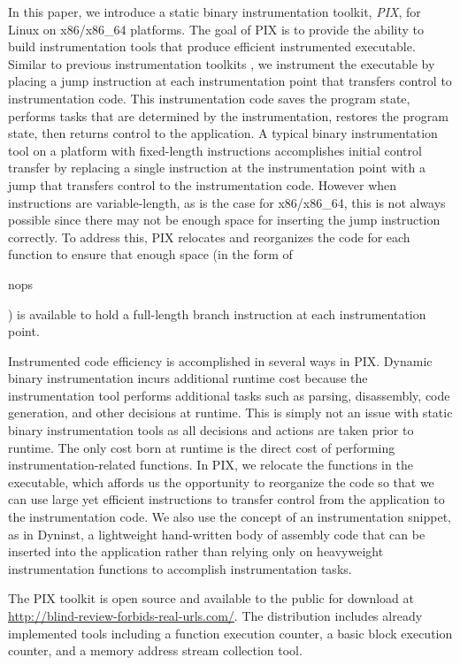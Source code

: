 In this paper, we introduce a static binary instrumentation toolkit, \textit{PIX}, for Linux on
x86/x86\_64 platforms. The goal of PIX is to provide the ability
to build instrumentation tools that produce efficient instrumented
executable. Similar to previous instrumentation toolkits \cite{buck2000api}, we instrument the executable 
by placing a jump instruction at each instrumentation
point that transfers control to instrumentation code. This instrumentation code saves the
program state, performs tasks that are determined by the instrumentation,
restores the program state, then returns control to the application.
A typical binary instrumentation tool on a platform with fixed-length instructions 
\cite{tikir2006pmac} accomplishes initial control transfer by replacing a
single instruction at the instrumentation point with a jump that transfers
control to the instrumentation code. However when instructions are variable-length, as
is the case for x86/x86\_64, this is not always possible since there may not be enough space for 
inserting the jump instruction correctly. To address this, PIX
relocates and reorganizes the code for each function to ensure that enough
space (in the form of \begin{it}nops\end{it}) is available to hold a full-length branch instruction at each
instrumentation point.

Instrumented code efficiency is accomplished in several ways in PIX. Dynamic binary instrumentation
incurs additional runtime cost because the instrumentation tool performs additional tasks such 
as parsing, disassembly, code generation, and other decisions at runtime. This
 is simply not an issue with static binary instrumentation tools as all
decisions and actions are taken prior to runtime. The only cost born at runtime is the direct
cost of performing instrumentation-related functions. In PIX, we relocate the 
functions in the executable, which affords us the opportunity to reorganize the code so that we
can use large yet efficient instructions to transfer control from the
application to the instrumentation code. We also use the concept of an
instrumentation snippet, as in Dyninst, a lightweight hand-written body of assembly code that can
be inserted into the application rather than relying only on heavyweight
instrumentation functions to accomplish instrumentation tasks.

The PIX toolkit is open source and available to the public for download 
at \url{http://blind-review-forbids-real-urls.com/}. The distribution includes already implemented tools 
including a function execution counter, a basic block
execution counter, and a memory address stream collection tool.

